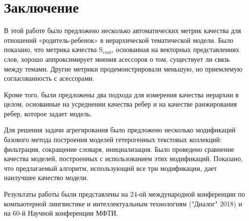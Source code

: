 \chapter{Заключение}

В этой работе было предложено несколько автоматических метрик качества для отношений «родитель-ребенок» в иерархической тематической модели. Было показано, что метрика качества $\mathrm{S}_{emb}$, основанная на векторных представлениях слов, хорошо аппроксимирует мнения асессоров о том, существует ли связь между темами. Другие метрики продемонстрировали меньшую, но приемлемую согласованность с асессорами.

Кроме того, были предложены два подхода для измерения качества иерархии в целом, основанные на усреднении качества ребер и на качестве ранжирования ребер, которое задает модель.

Для решения задачи агрегирования было предложено несколько модификаций базового метода построения моделей гетерогенных текстовых коллекций: фильтрация, сокращение словаря, инициализация. Было проведено сравнение качества моделей, построенных с использованием этих модификаций. Показано, что предлагаемый алгоритм, использующий все три модификации, дает наилучшее качество модели.

Результаты работы были представлены на 24-ой международной конференции
по компьютерной лингвистике и интеллектуальным технологиям ("Диалог" 2018) и на 60-й Научной конференции МФТИ.
